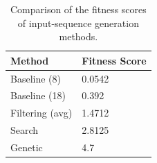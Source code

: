 \vspace{3mm}
\begin{table}[H]
	\centering
	\begin{tabular}{|l|l|}
		\hline
		\rowcolor[HTML]{EFEFEF} 
		\textbf{Method} & \textbf{Fitness Score}  \\ \hline
		Baseline (8)              	&  0.0542     \\ \hline
		Baseline (18)              	&  0.392      \\ \hline
		Filtering (avg)             &  1.4712     \\ \hline
		Search              		&  2.8125     \\ \hline
		Genetic              		&  4.7        \\ \hline
	\end{tabular}
	\caption{Comparison of the fitness scores of input-sequence generation methods.}
	\label{tab:compbasesearch}
\end{table}

